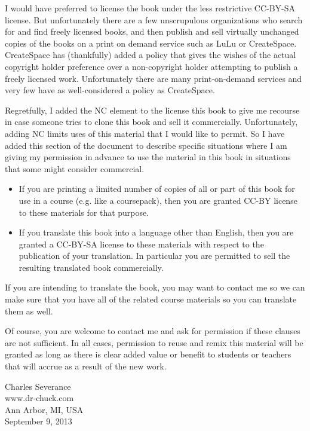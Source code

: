\documentclass[11pt]{book}
\begin{document}
I would have preferred to license the book under the less 
restrictive CC-BY-SA license.   But unfortunately there are
a few unscrupulous
organizations who search for and find freely licensed books,
and then publish and sell virtually unchanged copies of the books on a 
print on demand service such as LuLu or CreateSpace.  CreateSpace
has (thankfully) added a policy that gives the wishes of the actual 
copyright holder preference over a non-copyright holder attempting 
to publish a freely licensed work.  Unfortunately there are many 
print-on-demand services and very few have as well-considered a policy 
as CreateSpace.

Regretfully, I added the NC element to the license
this book to give me recourse in case someone tries to clone this 
book and sell it commercially.   Unfortunately, adding NC limits uses
of this material that I would like to permit.  So I have added this 
section of the document to describe specific situations where 
I am giving my permission in advance to use the material in this book
in situations that some might consider commercial.

\begin{itemize}
\item If you are printing a limited number of copies of all or part of 
this book for use in a course (e.g. like a coursepack), then 
you are granted CC-BY license to these materials for that purpose.

\item If you translate this book into a language other than English, then 
you are granted a CC-BY-SA license to these materials with respect to 
the publication of your translation. In particular you are permitted 
to sell the resulting translated book commercially.  
\end{itemize}

If you are intending to translate the book, you may want to contact me
so we can make sure that you have all of the related course materials so 
you can translate them as well.

Of course, you are welcome to contact me and ask for permission if these
clauses are not sufficient.  In all cases, permission to reuse and
remix this material will be granted as long as there is clear added value
or benefit to students or teachers that will accrue as a result of the 
new work.

Charles Severance\\
www.dr-chuck.com\\
Ann Arbor, MI, USA\\
September 9, 2013



\normalsize

\printindex

\clearemptydoublepage
\end{document}
